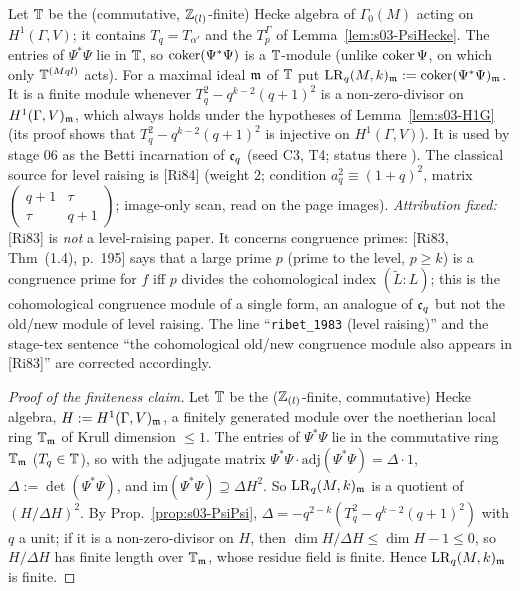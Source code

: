 \begin{definition}\label{def:s03-LR}
Let $\mathbb{T}$ be the (commutative, $\mathbb{Z}_{(l)}$-finite) Hecke algebra of $\Gamma_0(M)$ acting on $H^1(\Gamma,V)$; it contains $T_q=T_{\alpha'}$ and the $T_p^\Gamma$ of
Lemma~\ref{lem:s03-PsiHecke}. The entries of $\Psi^*\Psi$ lie in $\mathbb{T}$, so $\operatorname{coker}(\Psi^*\Psi)$ is a $\mathbb{T}$-module (unlike $\operatorname{coker}\Psi$, on which only
$\mathbb{T}^{(Mql)}$ acts). For a maximal ideal $\mathfrak{m}$ of $\mathbb{T}$ put
$\mathrm{LR}_q(M,k)_{\mathfrak{m}}:=\operatorname{coker}(\Psi^*\Psi)_{\mathfrak{m}}$. It is a finite module whenever $T_q^2-q^{k-2}(q+1)^2$ is a non-zero-divisor on
$H^1(\Gamma,V)_{\mathfrak{m}}$, which always holds under the hypotheses of Lemma~\ref{lem:s03-H1G} (its proof shows that $T_q^2-q^{k-2}(q+1)^2$ is injective on
$H^1(\Gamma,V)$).  It is used by stage 06 as the Betti incarnation of $\mathfrak{c}_q$ (seed C3, T4; status there
\stsketch). The classical source for level raising is [Ri84]
\stcited{} (weight $2$; condition $a_q^2\equiv(1+q)^2$, matrix $\left(\begin{smallmatrix}q+1&\tau\\\tau&q+1\end{smallmatrix}\right)$; image-only scan, read on the page images).
\emph{Attribution fixed:} [Ri83] is \emph{not} a level-raising paper. It concerns congruence primes: [Ri83, Thm~(1.4), p.~195]
 \stcited{} says that a large prime $p$ (prime to the level, $p\ge k$) is a
congruence prime for $f$ iff $p$ divides the cohomological index $(\tilde L:L)$; this is the cohomological congruence module of a single form, an analogue of
$\mathfrak{c}_q$ but not the old/new module of level raising. The  line ``\texttt{ribet\_1983} (level raising)'' and the stage-tex sentence ``the
cohomological old/new congruence module also appears in [Ri83]'' are corrected accordingly.
\end{definition}
\begin{proof}[Proof of the finiteness claim]
Let $\mathbb{T}$ be the ($\mathbb{Z}_{(l)}$-finite, commutative) Hecke algebra, $H:=H^1(\Gamma,V)_{\mathfrak{m}}$, a finitely generated module over the noetherian local ring $\mathbb{T}_{\mathfrak{m}}$ of Krull dimension $\le1$.
The entries of $\Psi^*\Psi$ lie in the commutative ring $\mathbb{T}_{\mathfrak{m}}$ ($T_q\in\mathbb{T}$), so with the adjugate matrix $\Psi^*\Psi\cdot\mathrm{adj}(\Psi^*\Psi)=\Delta\cdot1$, $\Delta:=\det(\Psi^*\Psi)$, and
$\mathrm{im}(\Psi^*\Psi)\supseteq\Delta H^2$. So $\mathrm{LR}_q(M,k)_{\mathfrak{m}}$ is a quotient of $(H/\Delta H)^2$. By Prop.~\ref{prop:s03-PsiPsi},
$\Delta=-q^{2-k}(T_q^2-q^{k-2}(q+1)^2)$ with $q$ a unit; if it is a non-zero-divisor on $H$, then $\dim H/\Delta H\le\dim H-1\le0$, so $H/\Delta H$ has finite length over
$\mathbb{T}_{\mathfrak{m}}$, whose residue field is finite. Hence $\mathrm{LR}_q(M,k)_{\mathfrak{m}}$ is finite. \stproved
\end{proof}

